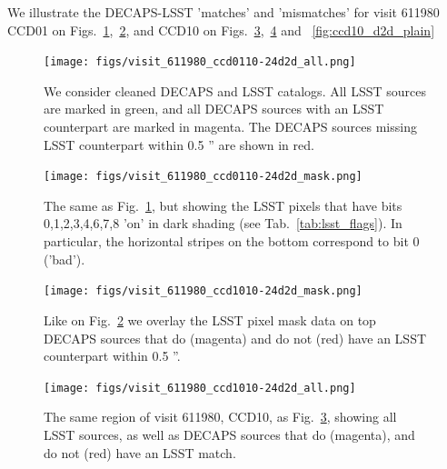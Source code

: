 \documentclass[DM,lsstdraft,toc,usenatbib]{lsstdoc}
\begin{document}
We illustrate the DECAPS-LSST 'matches' and 'mismatches' for visit 611980 CCD01 on Figs.~\ref{fig:matches_ill_d2d},~\ref{fig:matches_ill_d2d_mask}, and CCD10 on Figs.~\ref{fig:ccd10_d2d_mask},~\ref{fig:ccd10_d2d_all} and ~\ref{fig:ccd10_d2d_plain}


\begin{figure}
\begin{centering}
\texttt{[image: figs/visit\_611980\_ccd0110-24d2d\_all.png]}
\caption{We consider cleaned DECAPS and LSST catalogs. All LSST sources are marked in green, and all DECAPS sources with an LSST counterpart are marked in magenta. The DECAPS sources missing LSST counterpart within 0.5 '' are shown in red. }
\label{fig:matches_ill_d2d}
\end{centering}
\end{figure} 

\begin{figure}
\begin{centering}
\texttt{[image: figs/visit\_611980\_ccd0110-24d2d\_mask.png]}
\caption{The same as Fig.~\ref{fig:matches_ill_d2d}, but showing the LSST pixels that have bits  0,1,2,3,4,6,7,8 'on' in dark shading (see Tab.~\ref{tab:lsst_flags}). In particular, the horizontal stripes on the bottom correspond to bit 0 ('bad').}
\label{fig:matches_ill_d2d_mask}
\end{centering}
\end{figure} 


\begin{figure}
\begin{centering}
\texttt{[image: figs/visit\_611980\_ccd1010-24d2d\_mask.png]}
\caption{Like on Fig.~\ref{fig:matches_ill_d2d_mask} we overlay the LSST pixel mask data on top DECAPS sources that do (magenta) and do not  (red) have an LSST counterpart within 0.5 ''. }
\label{fig:ccd10_d2d_mask}
\end{centering}
\end{figure} 


\begin{figure}
\begin{centering}
\texttt{[image: figs/visit\_611980\_ccd1010-24d2d\_all.png]}
\caption{The same region of visit 611980, CCD10, as Fig.~\ref{fig:ccd10_d2d_mask}, showing all LSST sources, as well as DECAPS sources that do (magenta), and do not (red) have an LSST match. }
\label{fig:ccd10_d2d_all}
\end{centering}
\end{figure} 
\end{document}

